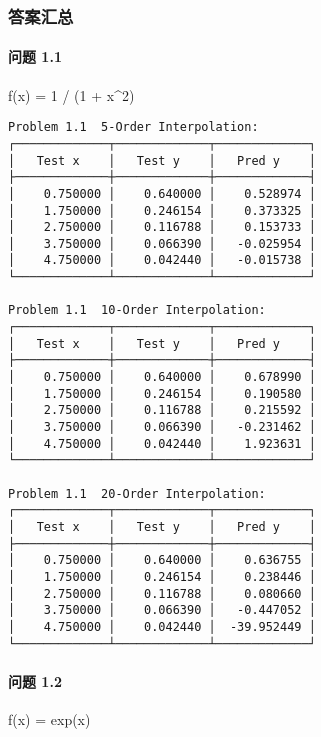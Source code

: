 \documentclass[11pt]{article}
\begin{document}
    \hypertarget{ux7b54ux6848ux6c47ux603b}{%
\subsubsection{答案汇总}\label{ux7b54ux6848ux6c47ux603b}}

    \hypertarget{ux95eeux9898-1.1}{%
\paragraph{问题 1.1}\label{ux95eeux9898-1.1}}

    f(x) = 1 / (1 + x\^{}2)

\begin{verbatim}
Problem 1.1  5-Order Interpolation:
┌─────────────┬─────────────┬─────────────┐
│   Test x    │   Test y    │   Pred y    │
├─────────────┼─────────────┼─────────────┤
│    0.750000 │    0.640000 │    0.528974 │
│    1.750000 │    0.246154 │    0.373325 │
│    2.750000 │    0.116788 │    0.153733 │
│    3.750000 │    0.066390 │   -0.025954 │
│    4.750000 │    0.042440 │   -0.015738 │
└─────────────┴─────────────┴─────────────┘

Problem 1.1  10-Order Interpolation:
┌─────────────┬─────────────┬─────────────┐
│   Test x    │   Test y    │   Pred y    │
├─────────────┼─────────────┼─────────────┤
│    0.750000 │    0.640000 │    0.678990 │
│    1.750000 │    0.246154 │    0.190580 │
│    2.750000 │    0.116788 │    0.215592 │
│    3.750000 │    0.066390 │   -0.231462 │
│    4.750000 │    0.042440 │    1.923631 │
└─────────────┴─────────────┴─────────────┘

Problem 1.1  20-Order Interpolation:
┌─────────────┬─────────────┬─────────────┐
│   Test x    │   Test y    │   Pred y    │
├─────────────┼─────────────┼─────────────┤
│    0.750000 │    0.640000 │    0.636755 │
│    1.750000 │    0.246154 │    0.238446 │
│    2.750000 │    0.116788 │    0.080660 │
│    3.750000 │    0.066390 │   -0.447052 │
│    4.750000 │    0.042440 │  -39.952449 │
└─────────────┴─────────────┴─────────────┘
\end{verbatim}

    \hypertarget{ux95eeux9898-1.2}{%
\paragraph{问题 1.2}\label{ux95eeux9898-1.2}}

    f(x) = exp(x)
\end{document}
